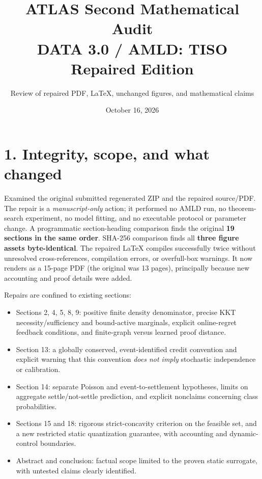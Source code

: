 \documentclass[10pt,letterpaper]{article}
\title{\vspace{-3ex}\textbf{ATLAS Second Mathematical Audit}\\[2pt]\large DATA 3.0 / AMLD: TISO Repaired Edition}
\author{Review of repaired PDF, LaTeX, unchanged figures, and mathematical claims}
\date{October 16, 2026}
\begin{document}
\maketitle
\vspace{-2.5ex}
\begin{center}
\end{center}

\section*{1. Integrity, scope, and what changed}
Examined the original submitted regenerated ZIP and the repaired source/PDF. The repair is a \emph{manuscript-only} action; it performed no AMLD run, no theorem-search experiment, no model fitting, and no executable protocol or parameter change. A programmatic section-heading comparison finds the original \textbf{19 sections in the same order}. SHA-256 comparison finds all \textbf{three figure assets byte-identical}. The repaired LaTeX compiles successfully twice without unresolved cross-references, compilation errors, or overfull-box warnings. It now renders as a 15-page PDF (the original was 13 pages), principally because new accounting and proof details were added.

Repairs are confined to existing sections:
\begin{itemize}
\item Sections 2, 4, 5, 8, 9: positive finite density denominator, precise KKT necessity/sufficiency and bound-active marginals, explicit online-regret feedback conditions, and finite-graph versus learned proof distance.
\item Section 13: a globally conserved, event-identified credit convention and explicit warning that this convention \emph{does not imply} stochastic independence or calibration.
\item Section 14: separate Poisson and event-to-settlement hypotheses, limits on aggregate settle/not-settle prediction, and explicit nonclaims concerning class probabilities.
\item Sections 15 and 18: rigorous strict-concavity criterion on the feasible set, and a new restricted static quantization guarantee, with accounting and dynamic-control boundaries.
\item Abstract and conclusion: factual scope limited to the proven static surrogate, with untested claims clearly identified.
\end{itemize}
\end{document}
